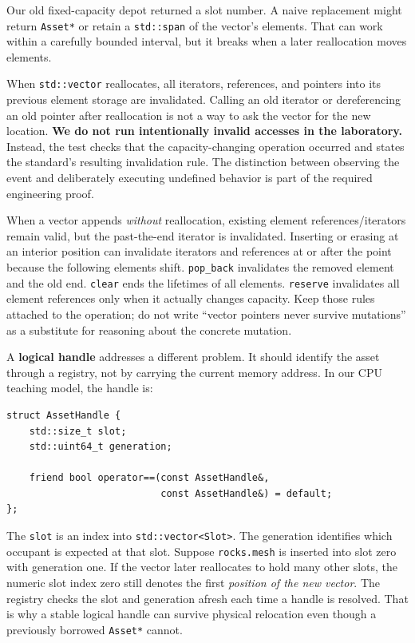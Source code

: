 Our old fixed-capacity depot returned a slot number. A naive replacement might return \texttt{Asset*} or retain a \texttt{std::span} of the vector's elements. That can work within a carefully bounded interval, but it breaks when a later reallocation moves elements.

When \texttt{std::vector} reallocates, all iterators, references, and pointers into its previous element storage are invalidated. Calling an old iterator or dereferencing an old pointer after reallocation is not a way to ask the vector for the new location. \textbf{We do not run intentionally invalid accesses in the laboratory.} Instead, the test checks that the capacity-changing operation occurred and states the standard's resulting invalidation rule. The distinction between observing the event and deliberately executing undefined behavior is part of the required engineering proof.

When a vector appends \emph{without} reallocation, existing element references/iterators remain valid, but the past-the-end iterator is invalidated. Inserting or erasing at an interior position can invalidate iterators and references at or after the point because the following elements shift. \texttt{pop\_back} invalidates the removed element and the old end. \texttt{clear} ends the lifetimes of all elements. \texttt{reserve} invalidates all element references only when it actually changes capacity. Keep those rules attached to the operation; do not write ``vector pointers never survive mutations'' as a substitute for reasoning about the concrete mutation.

A \textbf{logical handle} addresses a different problem. It should identify the asset through a registry, not by carrying the current memory address. In our CPU teaching model, the handle is:

\begin{verbatim}
struct AssetHandle {
    std::size_t slot;
    std::uint64_t generation;

    friend bool operator==(const AssetHandle&,
                           const AssetHandle&) = default;
};
\end{verbatim}

The \texttt{slot} is an index into \texttt{std::vector\textless{}Slot\textgreater{}}. The generation identifies which occupant is expected at that slot. Suppose \texttt{rocks.mesh} is inserted into slot zero with generation one. If the vector later reallocates to hold many other slots, the numeric slot index zero still denotes the first \emph{position of the new vector}. The registry checks the slot and generation afresh each time a handle is resolved. That is why a stable logical handle can survive physical relocation even though a previously borrowed \texttt{Asset*} cannot.

